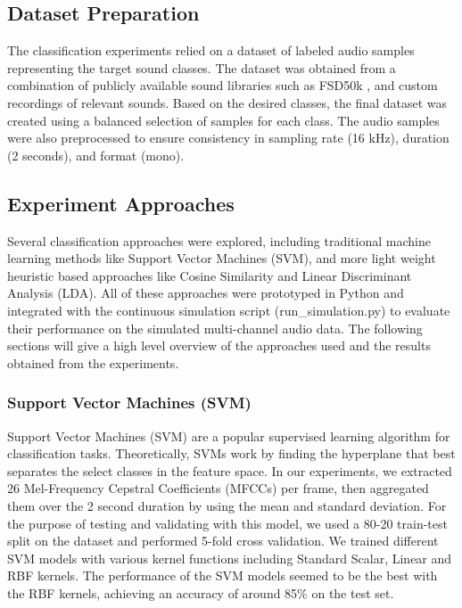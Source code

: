\documentclass[12pt, titlepage]{article}
\begin{document}
\subsection{Dataset Preparation}


The classification experiments relied on a dataset of labeled audio samples 
representing the target sound classes. The dataset was obtained from a 
combination of publicly available sound libraries such as FSD50k 
\cite{FSD50k}, and custom 
recordings of relevant sounds. Based on the desired classes, the final dataset 
was created using a balanced selection of samples for each class. The audio 
samples were also preprocessed to ensure consistency in sampling rate (16 kHz), 
duration (2 seconds), and format (mono). 


\subsection{Experiment Approaches}


Several classification approaches were explored, including traditional machine 
learning methods like Support Vector Machines (SVM), and more light weight 
heuristic based approaches like Cosine Similarity and Linear Discriminant 
Analysis (LDA). All of these approaches were prototyped in Python and 
integrated with the continuous simulation script (run_simulation.py) to 
evaluate their performance on the simulated multi-channel audio data. The 
following sections will give a high level overview of the approaches used and 
the results obtained from the experiments.


\subsubsection{Support Vector Machines (SVM)}


Support Vector Machines (SVM) are a popular supervised learning algorithm for 
classification tasks. Theoretically, SVMs work by finding the hyperplane that 
best separates the select classes in the feature space. In our experiments, 
we extracted 26 Mel-Frequency Cepstral Coefficients (MFCCs) per frame, then 
aggregated them over the 2 second duration by using the mean and standard 
deviation. For the purpose of testing and validating with this model, we 
used a 80-20 train-test split on the dataset and performed 5-fold cross 
validation. We trained different SVM models with various kernel functions 
including Standard Scalar, Linear and RBF kernels. The performance of the SVM 
models seemed to be the best with the RBF kernels, achieving an accuracy of 
around 85\% on the test set.
\end{document}
